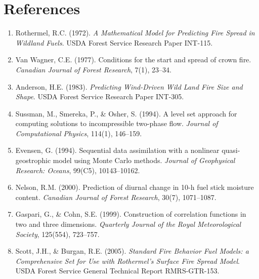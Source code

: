 \documentclass[11pt,twocolumn]{article}
\begin{document}
\section*{References}

\begin{enumerate}\small
  \item Rothermel, R.C. (1972). \textit{A Mathematical Model for
        Predicting Fire Spread in Wildland Fuels}. USDA Forest
        Service Research Paper INT-115.
  \item Van Wagner, C.E. (1977). Conditions for the start and spread
        of crown fire. \textit{Canadian Journal of Forest Research},
        7(1), 23--34.
  \item Anderson, H.E. (1983). \textit{Predicting Wind-Driven Wild Land
        Fire Size and Shape}. USDA Forest Service Research Paper
        INT-305.
  \item Sussman, M., Smereka, P., \& Osher, S. (1994). A level set
        approach for computing solutions to incompressible two-phase
        flow. \textit{Journal of Computational Physics}, 114(1),
        146--159.
  \item Evensen, G. (1994). Sequential data assimilation with a
        nonlinear quasi-geostrophic model using Monte Carlo methods.
        \textit{Journal of Geophysical Research: Oceans},
        99(C5), 10143--10162.
  \item Nelson, R.M. (2000). Prediction of diurnal change in
        10-h fuel stick moisture content. \textit{Canadian Journal
        of Forest Research}, 30(7), 1071--1087.
  \item Gaspari, G., \& Cohn, S.E. (1999). Construction of
        correlation functions in two and three dimensions.
        \textit{Quarterly Journal of the Royal Meteorological
        Society}, 125(554), 723--757.
  \item Scott, J.H., \& Burgan, R.E. (2005). \textit{Standard Fire
        Behavior Fuel Models: a Comprehensive Set for Use with
        Rothermel's Surface Fire Spread Model}. USDA Forest Service
        General Technical Report RMRS-GTR-153.
\end{enumerate}
\end{document}
